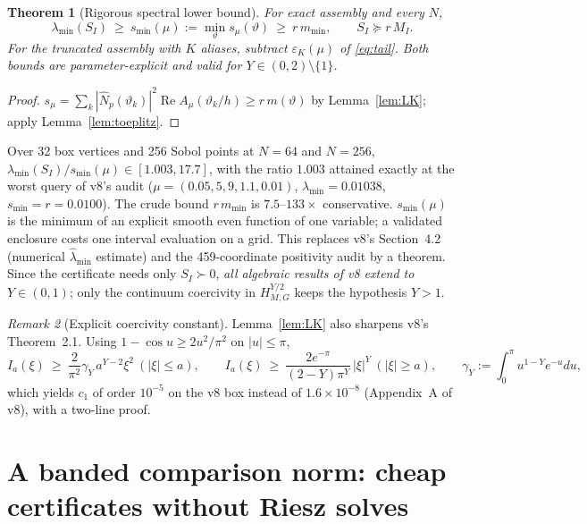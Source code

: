 \documentclass[11pt]{amsart}
\newtheorem{theorem}{Theorem}[section]
\theoremstyle{remark}
\newtheorem{remark}[theorem]{Remark}
\DeclareMathOperator{\Real}{Re}
\begin{document}
\begin{theorem}[Rigorous spectral lower bound]\label{thm:spectral}
For exact assembly and every $N$,
\begin{equation}
 \lambda_{\min}(S_I)\ \ge\ s_{\min}(\mu):=\min_{\vartheta}s_\mu(\vartheta)
 \ \ge\ r\,m_{\min},
 \qquad S_I\succeq r\,M_I .
 \label{eq:spectral}
\end{equation}
For the truncated assembly with $K$ aliases, subtract $\varepsilon_K(\mu)$ of
\eqref{eq:tail}.  Both bounds are parameter-explicit and valid for
$Y\in(0,2)\setminus\{1\}$.
\end{theorem}
\begin{proof}
$s_\mu=\sum_k|\widehat N_p(\vartheta_k)|^2\Real A_\mu(\vartheta_k/h)\ge r\,m(\vartheta)$
by Lemma~\ref{lem:LK}; apply Lemma~\ref{lem:toeplitz}.
\end{proof}

\noindent
Over 32 box vertices and 256 Sobol points at $N=64$ and $N=256$,
$\lambda_{\min}(S_I)/s_{\min}(\mu)\in[1.003,17.7]$, with the ratio $1.003$
attained exactly at the worst query of v8's audit
($\mu=(0.05,5,9,1.1,0.01)$, $\lambda_{\min}=0.01038$, $s_{\min}=r=0.0100$).
The crude bound $r\,m_{\min}$ is $7.5$--$133\times$ conservative.  $s_{\min}(\mu)$ is
the minimum of an explicit smooth even function of one variable; a validated
enclosure costs one interval evaluation on a grid.  This replaces v8's
Section~4.2 (numerical $\widehat\lambda_{\min}$ estimate) and the
459-coordinate positivity audit by a theorem.  Since the certificate needs
only $S_I\succ0$, \emph{all algebraic results of v8 extend to $Y\in(0,1)$};
only the continuum coercivity in $H^{Y/2}_{M,G}$ keeps the hypothesis $Y>1$.

\begin{remark}[Explicit coercivity constant]
Lemma~\ref{lem:LK} also sharpens v8's Theorem~2.1.  Using $1-\cos u\ge2u^2/\pi^2$
on $|u|\le\pi$,
\[
 I_a(\xi)\ \ge\ \frac{2}{\pi^2}\gamma_Y\,a^{Y-2}\xi^2\ (|\xi|\le a),\qquad
 I_a(\xi)\ \ge\ \frac{2e^{-\pi}}{(2-Y)\pi^Y}\,|\xi|^Y\ (|\xi|\ge a),\qquad
 \gamma_Y:=\int_0^\pi u^{1-Y}e^{-u}du,
\]
which yields $c_1$ of order $10^{-5}$ on the v8 box instead of
$1.6\times10^{-8}$ (Appendix~A of v8), with a two-line proof.
\end{remark}

\section{A banded comparison norm: cheap certificates without Riesz solves}
\end{document}
